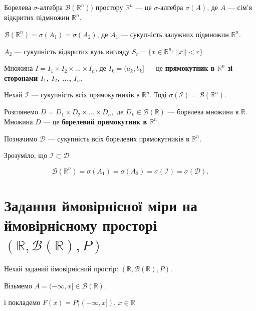\begin{definition}
    Борелева $\sigma$-алгебра $\mathcal{B}(\mathbb{R}^n))$ простору
    $\mathbb{R}^n$ --- це $\sigma$-алгебра $\sigma(A)$, де
    $A$ --- сім'я відкритих підмножин $\mathbb{R}^n$.
\end{definition}

\begin{remark}
    $\mathcal{B}(\mathbb{R}^n) = \sigma(A_1) = \sigma(A_2)$,
    де $A_1$ --- сукупність залужних підмножин $\mathbb{R}^n$.
    
    $A_2$ --- сукупність відкритих куль вигляду
    $S_r = \{x \in \mathbb{R}^n: ||x|| < r\}$
\end{remark}

\begin{definition}
    Множина $I = I_1 \times I_2 \times ... \times I_n$, де
    $I_k = (a_k, b_k]$ --- це \textbf{прямокутник в $\mathbb{R}^n$
    зі сторонами $I_1$, $I_2$, ..., $I_n$}.
\end{definition}

Нехай $\mathcal{I}$ --- сукупність всіх прямокутників в $\mathbb{R}^n$.
Тоді $\sigma(\mathcal{I}) = \mathcal{B}(\mathbb{R}^n)$.

Розглянемо $D = D_1 \times D_2 \times ... \times D_n,$
де $D_k \in \mathcal{B}(\mathbb{R})$ --- борелева множина
в $\mathbb{R}$.
Множина $D$ --- це \textbf{борелевий прямокутник в $\mathbb{R}^n$}.

Позначимо $\mathcal{D}$ --- сукупність всіх борелевих прямокутників
в $\mathbb{R}^n$. 

Зрозуміло, що $\mathcal{I} \subset \mathcal{D}$

\begin{claim}
    $$\mathcal{B}(\mathbb{R}^n)
    = \sigma(A_1)
    = \sigma(A_2)
    = \sigma(\mathcal{I})
    = \sigma(\mathcal{D}).$$
\end{claim}

\section[Задання ймовірнісної міри на ймовірнісному просторі]
{Задання ймовірнісної міри на ймовірнісному просторі $(\mathbb{R}, \mathcal{B}(\mathbb{R}), P)$}

Нехай заданий ймовірнісний простір: $(\mathbb{R}, \mathcal{B}(\mathbb{R}), P)$.

Візьмемо $A = (-\infty, x] \in \mathcal{B}(\mathbb{R})$.

і покладемо $F(x) = P((-\infty, x])$, $x \in \mathbb{R}$

